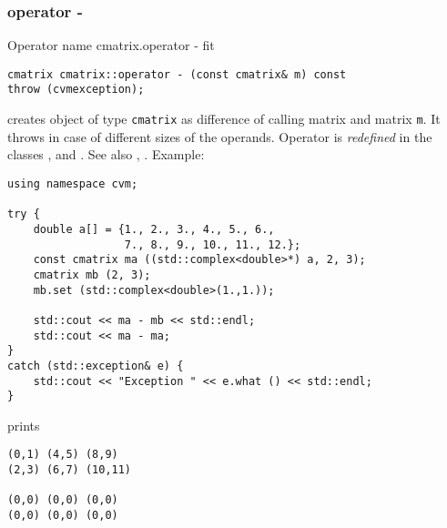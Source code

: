 \subsubsection{operator -}
Operator%
\pdfdest name {cmatrix.operator -} fit
\begin{verbatim}
cmatrix cmatrix::operator - (const cmatrix& m) const
throw (cvmexception);
\end{verbatim}
creates  object of type \verb"cmatrix" as  difference of
 calling matrix and  matrix \verb"m".
It throws  
in case of different sizes of the operands.
Operator is \emph{redefined} in the classes
,  
and .
See also , .
Example:
\begin{Verbatim}
using namespace cvm;

try {
    double a[] = {1., 2., 3., 4., 5., 6.,
                  7., 8., 9., 10., 11., 12.};
    const cmatrix ma ((std::complex<double>*) a, 2, 3);
    cmatrix mb (2, 3);
    mb.set (std::complex<double>(1.,1.));

    std::cout << ma - mb << std::endl;
    std::cout << ma - ma;
}
catch (std::exception& e) {
    std::cout << "Exception " << e.what () << std::endl;
}
\end{Verbatim}
prints
\begin{Verbatim}
(0,1) (4,5) (8,9)
(2,3) (6,7) (10,11)

(0,0) (0,0) (0,0)
(0,0) (0,0) (0,0)
\end{Verbatim}
\newpage



